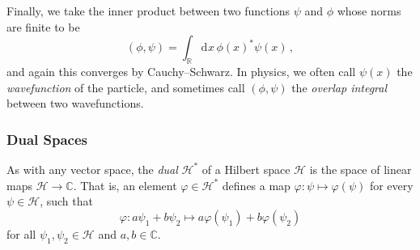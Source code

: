 \documentclass{article}
\theoremstyle{plain}\theoremheaderfont{\normalfont\itshape}\theorembodyfont{\rmfamily}\theoremseparator{.}\newtheorem*{rem}{Remark}\newtheorem*{ex}{Example}\newtheorem*{proof}{Proof}\newtheorem*{altp}{Alternative proof}
\theoremstyle{plain}\theoremheaderfont{\normalfont\bfseries}\theorembodyfont{\rmfamily}\theoremseparator{.}\newtheorem{thm}{Theorem}[section]\newtheorem{lem}[thm]{Lemma}\newtheorem{prop}[thm]{Proposition}\newtheorem*{cor}{Corollary}\newtheorem{defn}[thm]{Definition}\newtheorem{clm}[thm]{Claim}\newtheorem{clminproof}{Claim}
\theoremstyle{break}\theoremheaderfont{\normalfont\itshape}\theorembodyfont{\rmfamily}\theoremseparator{.\medskip}\newtheorem*{proofskip}{Proof}\newtheorem*{exs}{Examples}\newtheorem*{rems}{Remarks}
\theoremstyle{break}\theoremheaderfont{\normalfont\bfseries}\theorembodyfont{\rmfamily}\theoremseparator{.\medskip}\newtheorem{lemskip}[thm]{Lemma}\newtheorem{defnskip}[thm]{Definition}\newtheorem{propskip}[thm]{Proposition}\newtheorem{thmskip}[thm]{Theorem}
\numberwithin{equation}{section}
\newcommand{\dd}[2][]{\mathrm{d}^{#1} #2\,}
\newcommand{\hb}{\mathcal{H}}
\newcommand{\RR}{\mathbb{R}}
\newcommand{\CC}{\mathbb{C}}
\begin{document}
    Finally, we take the inner product between two functions \(\psi\) and \(\phi\) whose norms are finite to be
    \begin{equation}
        (\phi,\psi)=\int_\RR\dd{x}\phi(x)^*\psi(x)\,,
    \end{equation}
    and again this converges by Cauchy--Schwarz. In physics, we often call \(\psi(x)\) the \textit{wavefunction} of the particle, and sometimes call \((\phi,\psi)\) the \textit{overlap integral} between two wavefunctions.
    \subsubsection{Dual Spaces}
    As with any vector space, the \textit{dual} \(\hb^*\) of a Hilbert space \(\hb\) is the space of linear maps \(\hb\to\CC\). That is, an element \(\varphi\in\hb^*\) defines a map \(\varphi:\psi\mapsto\varphi(\psi)\) for every \(\psi\in\hb\), such that
    \begin{equation}
        \varphi:a\psi_1+b\psi_2\longmapsto a\varphi(\psi_1)+b\varphi(\psi_2)
    \end{equation}
    for all \(\psi_1,\psi_2\in\hb\) and \(a,b\in\CC\).
\end{document}
